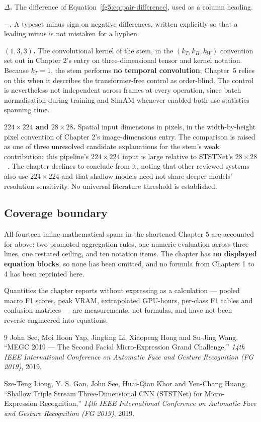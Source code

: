 \documentclass[11pt,a4paper]{article}
\numberwithin{equation}{section}
\begin{document}
\textbf{$\Delta$.} The difference of
Equation~\eqref{fg5:eq:pair-difference}, used as a column heading.

\textbf{$-$.} A typeset minus sign on negative differences, written
explicitly so that a leading minus is not mistaken for a hyphen.

\textbf{$(1,3,3)$.} The convolutional kernel of the stem, in the
$(k_T,k_H,k_W)$ convention set out in Chapter 2's entry on
three-dimensional tensor and kernel notation. Because $k_T = 1$, the stem performs \textbf{no temporal
convolution}; Chapter~5 relies on this when it describes the transformer-free
control as order-blind. The control is nevertheless not independent across
frames at every operation, since batch normalisation during training and
SimAM whenever enabled both use statistics spanning time.

\textbf{$224\times224$ and $28\times28$.} Spatial input dimensions in pixels,
in the width-by-height pixel convention of Chapter 2's image-dimensions
entry. The comparison is raised as one of three unresolved candidate
explanations for the stem's weak contribution: this pipeline's
$224\times224$ input is large relative to STSTNet's
$28\times28$~\cite{liong2019b}. The chapter declines to conclude from it,
noting that other reviewed systems also use $224\times224$ and that shallow
models need not share deeper models' resolution sensitivity. No universal
literature threshold is established.

\subsection{Coverage boundary}

All fourteen inline mathematical spans in the shortened Chapter 5 are
accounted for above: two promoted aggregation rules, one numeric evaluation
across three lines, one restated ceiling, and ten notation items. The chapter
has \textbf{no displayed equation blocks}, so none has been omitted, and no
formula from Chapters 1 to 4 has been reprinted here.

Quantities the chapter reports without expressing as a calculation --- pooled
macro F1 scores, peak VRAM, extrapolated GPU-hours, per-class F1 tables and
confusion matrices --- are measurements, not formulas, and have not been
reverse-engineered into equations.

\begin{thebibliography}{9}
John See, Moi Hoon Yap, Jingting Li, Xiaopeng Hong and Su-Jing Wang,
``MEGC 2019 --- The Second Facial Micro-Expression Grand Challenge,''
\emph{14th IEEE International Conference on Automatic Face and Gesture
Recognition (FG 2019)}, 2019.

Sze-Teng Liong, Y. S. Gan, John See, Huai-Qian Khor and Yen-Chang Huang,
``Shallow Triple Stream Three-Dimensional CNN (STSTNet) for Micro-Expression
Recognition,'' \emph{14th IEEE International Conference on Automatic Face and
Gesture Recognition (FG 2019)}, 2019.
\end{thebibliography}
\end{document}
